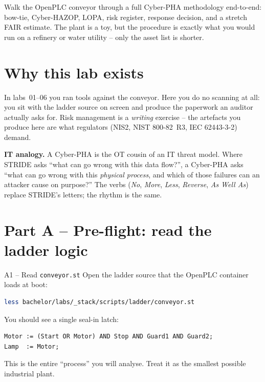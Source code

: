 \documentclass[11pt,a4paper]{article}
\begin{document}
\labheader

\begin{goalbox}
Walk the OpenPLC conveyor through a full Cyber-PHA methodology end-to-end: bow-tie, Cyber-HAZOP, LOPA, risk register, response decision, and a stretch FAIR estimate. The plant is a toy, but the procedure is exactly what you would run on a refinery or water utility -- only the asset list is shorter.
\end{goalbox}

\section*{Why this lab exists}

In labs~01--06 you ran tools against the conveyor. Here you do no scanning at all: you sit with the ladder source on screen and produce the paperwork an auditor actually asks for. Risk management is a \emph{writing} exercise -- the artefacts you produce here are what regulators (NIS2, NIST 800-82~R3, IEC 62443-3-2) demand.

\medskip\noindent
\textbf{IT analogy.} A Cyber-PHA is the OT cousin of an IT threat model. Where STRIDE asks ``what can go wrong with this data flow?'', a Cyber-PHA asks ``what can go wrong with this \emph{physical process}, and which of those failures can an attacker cause on purpose?'' The verbs (\emph{No}, \emph{More}, \emph{Less}, \emph{Reverse}, \emph{As Well As}) replace STRIDE's letters; the rhythm is the same.

\section*{Part A -- Pre-flight: read the ladder logic}

\begin{stepbox}{A1 -- Read \texttt{conveyor.st}}
Open the ladder source that the OpenPLC container loads at boot:
\begin{lstlisting}[language=bash]
less bachelor/labs/_stack/scripts/ladder/conveyor.st
\end{lstlisting}
You should see a single seal-in latch:
\begin{lstlisting}
Motor := (Start OR Motor) AND Stop AND Guard1 AND Guard2;
Lamp  := Motor;
\end{lstlisting}
This is the entire ``process'' you will analyse. Treat it as the smallest possible industrial plant.
\end{stepbox}
\end{document}
